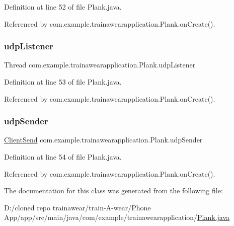 Definition at line 52 of file Plank.\+java.



Referenced by com.\+example.\+trainawearapplication.\+Plank.\+on\+Create().

\mbox{\label{classcom_1_1example_1_1trainawearapplication_1_1_plank_ac43cc854533c5fc22b5638149d26512c}} 
\subsubsection{\texorpdfstring{udpListener}{udpListener}}
{\footnotesize\ttfamily Thread com.\+example.\+trainawearapplication.\+Plank.\+udp\+Listener\hspace{0.3cm}{\ttfamily [private]}}



Definition at line 53 of file Plank.\+java.



Referenced by com.\+example.\+trainawearapplication.\+Plank.\+on\+Create().

\mbox{\label{classcom_1_1example_1_1trainawearapplication_1_1_plank_a840985b7a4ec5f3092c91a8336e616e9}} 
\subsubsection{\texorpdfstring{udpSender}{udpSender}}
{\footnotesize\ttfamily \mbox{\hyperlink{classcom_1_1example_1_1trainawearapplication_1_1_client_send}{Client\+Send}} com.\+example.\+trainawearapplication.\+Plank.\+udp\+Sender\hspace{0.3cm}{\ttfamily [private]}}



Definition at line 54 of file Plank.\+java.



Referenced by com.\+example.\+trainawearapplication.\+Plank.\+on\+Create().



The documentation for this class was generated from the following file\+:\begin{DoxyCompactItemize}
\item 
D\+:/cloned repo trainawear/train-\/\+A-\/wear/\+Phone App/app/src/main/java/com/example/trainawearapplication/\mbox{\hyperlink{_plank_8java}{Plank.\+java}}\end{DoxyCompactItemize}
